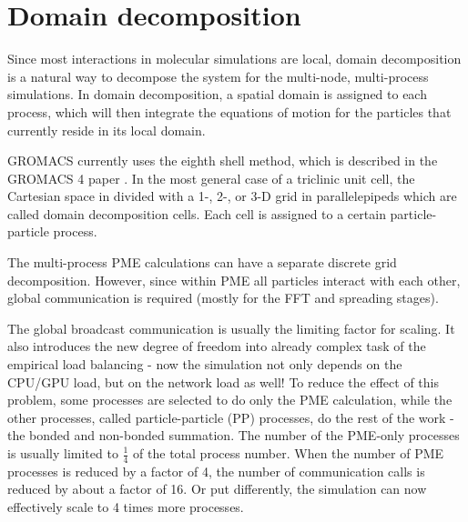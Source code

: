 \documentclass[12pt,a4paper]{report}
\newcommand{\draft}[1]{#1}
\begin{document}
\section{Domain decomposition} \label{chapter:DD}
Since most interactions in molecular simulations are local, domain decomposition is a natural way to decompose the system for the multi-node, multi-process simulations. In domain decomposition, a spatial domain is assigned to each process,
which will then integrate the equations of motion for the particles that currently reside in its local
domain.

GROMACS currently uses the eighth shell method, which is described in the GROMACS 4 paper \cite{gromacs4dd}. In the most general case of a triclinic unit cell, the Cartesian space in divided with a 1-, 2-, or 3-D grid in
parallelepipeds which are called domain decomposition cells. Each cell is assigned to a certain \draft{particle-particle}
process. 

The multi-process PME calculations can have a separate discrete grid decomposition.
However, since within PME all particles interact with each other, global communication is required (mostly for the FFT and spreading stages). 

The global broadcast communication is usually the limiting factor for scaling. It also introduces the new degree of freedom into already complex task of the empirical load balancing - now the simulation not only depends on the CPU/GPU load, but on the network load as well! 
 To reduce the effect of this problem, some processes are selected to do only the PME calculation, while the other processes, called particle-particle (PP) processes, do the rest of the work - the bonded and non-bonded summation. The number of the PME-only processes is usually limited to $\frac{1}{4}$ of the total process number. When the number of PME processes is reduced by a factor of
4, the number of communication calls is reduced by about a factor of 16. Or put differently, the simulation can now effectively scale to 4 times more processes.
 

\end{document}
